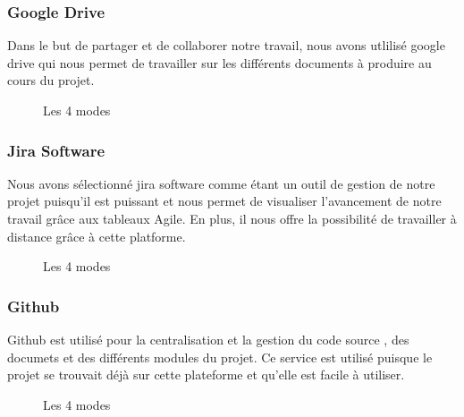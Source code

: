 \documentclass[a4paper,12pt]{book}
\begin{document}
\subsubsection{Google Drive}
Dans le but de partager et de collaborer notre travail, nous avons utlilisé google drive qui nous permet de travailler sur les différents documents à produire au cours du projet.
\begin{figure}[h]
	\begin{center}
		\centering
	\end{center}
	\caption{Les 4 modes}
\end{figure}
\subsubsection{Jira Software}
Nous avons sélectionné jira software comme étant un outil de gestion de notre projet puisqu'il est  puissant et nous permet de visualiser l'avancement de notre travail grâce aux tableaux Agile. En plus, il nous offre la possibilité de travailler à distance grâce à cette platforme.
\begin{figure}[h]
	\begin{center}
		\centering
	\end{center}
	\caption{Les 4 modes}
\end{figure}
\subsubsection{Github}
Github est utilisé pour la centralisation et la gestion du code source , des documets et des différents modules du projet. Ce service est utilisé puisque le projet se trouvait déjà sur cette plateforme et qu’elle est facile à utiliser.
\begin{figure}[h]
	\begin{center}
		\centering
	\end{center}
	\caption{Les 4 modes}
\end{figure}
\end{document}
